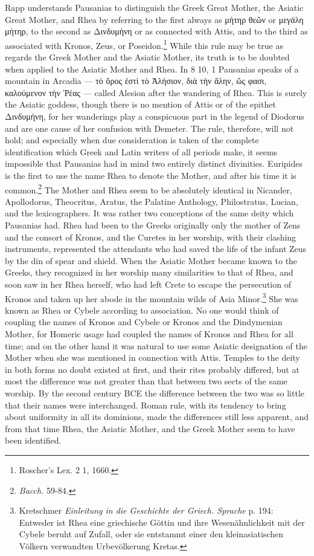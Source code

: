 \documentclass[a4paper, 11pt, oneside, polutonikogreek, english]{article}
\begin{document}
Rapp understands Pausanias to distinguish the Greek Great Mother, the Asiatic Great Mother, and Rhea by referring to the first always as μήτηρ θεῶν or μεγάλη μήτηρ, to the second as Δινδυμήνη or as connected with Attis, and to the third as associated with Kronos, Zeus, or Poseidon.\footnote{Roscher's Lex. 2 1, 1660.} While this rule may be true as regards the Greek Mother and the Asiatic Mother, its truth is to be doubted when applied to the Asiatic Mother and Rhea. In 8 10, 1 Pausanias speaks of a mountain in Arcadia --- τὸ ὄρος ἐστὶ τὸ Ἀλήσιον, διὰ τὴν ἄλην, ὥς φασι, καλούμενον τὴν Ῥέας --- called Alesion after the wandering of Rhea. This is surely the Asiatic goddess, though there is no mention of Attis or of the epithet Δινδυμήνη, for her wanderings play a conspicuous part in the legend of Diodorus and are one cause of her confusion with Demeter. The rule, therefore, will not hold; and especially when due consideration is taken of the complete identification which Greek and Latin writers of all periods make, it seems impossible that Pausanias had in mind two entirely distinct divinities. Euripides is the first to use the name Rhea to denote the Mother, and after his time it is common.\footnote{\emph{Bacch.} 59-84.} The Mother and Rhea seem to be absolutely identical in Nicander, Apollodorus, Theocritus, Aratus, the Palatine Anthology, Philostratus, Lucian, and the lexicographers. It was rather two conceptions of the same deity which Pausanias had. Rhea had been to the Greeks originally only the mother of Zens and the consort of Kronos, and the Curetes in her worship, with their clashing instruments, represented the attendants who had saved the life of the infant Zeus by the din of spear and shield. When the Asiatic Mother became known to the Greeks, they recognized in her worship many similarities to that of Rhea, and soon saw in her Rhea herself, who had left Crete to escape the persecution of Kronos and taken up her abode in the mountain wilds of Asia Minor.\footnote{Kretschmer \emph{Einleitung in die Geschichte der Griech. Sprache} p. 194: Entweder ist Rhea eine griechische Göttin und ihre Wesenähnlichkeit mit der Cybele beruht auf Zufall, oder sie entstammt einer den kleinasiatischen Völkern verwandten Urbevölkerung Kretas.} She was known as Rhea or Cybele according to association. No one would think of coupling the names of Kronos and Cybele or Kronos and the Dindymenian Mother, for Homeric usage had coupled the names of Kronos and Rhea for all time; and on the other hand it was natural to use some Asiatic designation of the Mother when she was mentioned in connection with Attis. Temples to the deity in both forms no doubt existed at first, and their rites probably differed, but at most the difference was not greater than that between two sects of the same worship. By the second century \textsc{BCE} the difference between the two was so little that their names were interchanged. Roman rule, with its tendency to bring about uniformity in all its dominions, made the differences still less apparent, and from that time Rhea, the Asiatic Mother, and the Greek Mother seem to have been identified.
\clearpage
\end{document}
